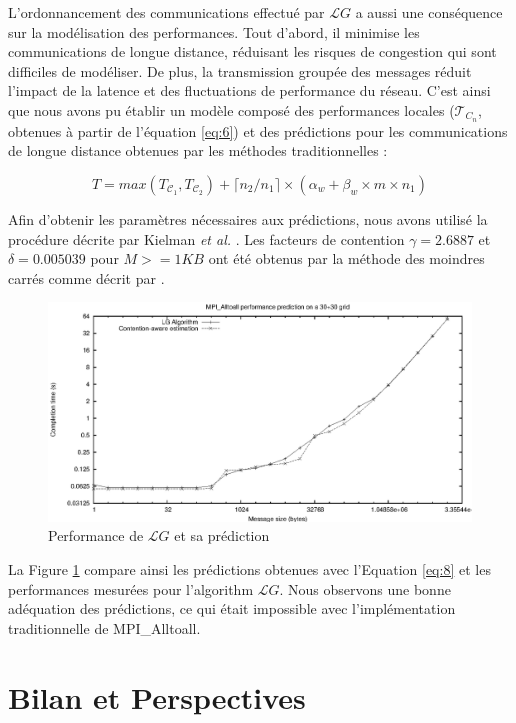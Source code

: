 L'ordonnancement des communications effectué par ${\mathcal LG}$ a aussi une conséquence sur la modélisation des performances. Tout d'abord, il minimise les communications de longue distance, réduisant les risques de congestion qui sont difficiles de modéliser. De plus, la transmission groupée des messages réduit l'impact de la latence et des fluctuations de performance du réseau. C'est ainsi que nous avons pu établir un modèle composé des performances locales (${\mathcal T_{C_{n}}}$, obtenues à partir de l'équation \ref{eq:6}) et des prédictions pour les communications de longue distance obtenues par les méthodes traditionnelles :

\begin{equation}
T=max(T_{\mathcal C_1},T_{\mathcal C_2})+\lceil n_2/n_1\rceil \times (\alpha_w+\beta_w \times m \times n_1)
\label{eq:8}\end{equation}

Afin d'obtenir les paramètres nécessaires aux prédictions, nous avons utilisé la procédure décrite par Kielman \textit{et al.} \cite{Kielmann00}. Les facteurs de contention $\gamma=2.6887$ et $\delta=0.005039$ pour $M>=1KB$ ont été obtenus par la méthode des moindres carrés comme décrit par \cite{Steffenel06b}.

\begin{figure}
	\begin{center}\includegraphics[width=0.7\columnwidth]{images/simul}\end{center}
	\caption{\label{Figure: simul}Performance de ${\mathcal LG}$ et sa prédiction}
\end{figure}

La Figure \ref{Figure: simul} compare ainsi les prédictions obtenues avec l'Equation \ref{eq:8} et les performances mesurées pour l'algorithm ${\mathcal LG}$. Nous observons une bonne adéquation des prédictions, ce qui était impossible avec l'implémentation traditionnelle de MPI\_Alltoall. 

\section{Bilan et Perspectives}

